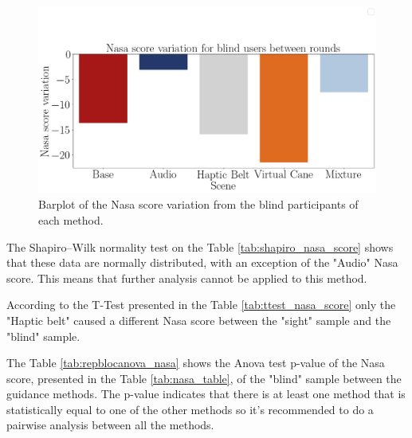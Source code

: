 \begin{figure}[!htb]
    \centering
    \includegraphics[width = 0.8\linewidth]{Resultados/Nasa/Figuras/png/barplot_nasa_var_scene_blind.png}
    \caption{Barplot of the Nasa score variation from the blind participants of each method.}
    \label{fig:barplot_nasa_var_scene_blind}
\end{figure}

The Shapiro–Wilk normality test on the Table \ref{tab:shapiro_nasa_score} shows that these data are normally distributed, with an exception of the "Audio" Nasa score. This means that further analysis cannot be applied to this method.

According to the T-Test presented in the Table \ref{tab:ttest_nasa_score} only the "Haptic belt" caused a different Nasa score between the "sight" sample and the "blind" sample.

\begin{table}[!htb]
    \begin{minipage}{.45\linewidth}
        
    \end{minipage}
    \hfill
    \begin{minipage}{.45\linewidth}
        \vspace{-2.75cm}
        
    \end{minipage}
\end{table}

The Table \ref{tab:repblocanova_nasa} shows the Anova test p-value of the Nasa score, presented in the Table \ref{tab:nasa_table}, of the "blind" sample between the guidance methods. The p-value indicates that there is at least one method that is statistically equal to one of the other methods so it's recommended to do a pairwise analysis between all the methods.

